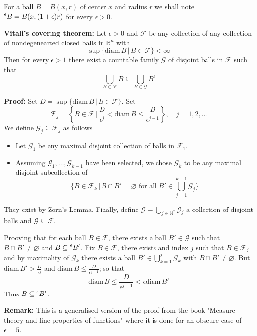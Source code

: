 \documentclass{article}
\begin{document}
For a ball $B=B(x, r)$ of center $x$ and radius $r$ we shall note $\prescript{\epsilon}{}B
=B(x, (1+\epsilon)r)$ for every $\epsilon>0$.

\vspace{1ex}
\textbf{Vitali's covering theorem:}
Let $\epsilon > 0$ and $\mathcal{F}$ be any collection of any collection of
nondegenearted closed balls in $\mathbb{R}^n$ with
\[ \sup\{\text{diam}\,B\,|\, B\in\mathcal{F}\}<\infty \]
Then for every $\epsilon>1$ there exist a countable family $\mathcal{G}$ of
disjoint balls in $\mathcal{F}$ such that
\[\bigcup_{B\in\mathcal{F}}B\subseteq\bigcup_{B\in\mathcal{G}}B^\epsilon\]

\vspace{1ex}
\textbf{Proof:}
Set $D=\sup\{\text{diam}\,B\,|\,B\in \mathcal{F}\}$. Set
\[\mathcal{F}_j=\left\{B\in\mathcal{F}\,|\,\frac{D}{\epsilon^j}<\text{diam}\,B\leq\frac{D}{\epsilon^{j-1}}\right\},\quad j=1,2,\ldots\]
We define $\mathcal{G}_j\subseteq\mathcal{F}_j$ as follows
\begin{itemize}
    \item Let $\mathcal{G}_1$ be any maximal disjoint collection of balls in
        $\mathcal{F}_1$.

    \item Assuming $\mathcal{G}_1,\ldots,\mathcal{G}_{k-1}$ have been selected,
        we chose $\mathcal{G}_k$ to be any maximal disjoint subcollection of
        \[ \{B\in\mathcal{F}_k\,|\,B\cap B'=\varnothing\text{ for all }B'\in\bigcup_{j=1}^{k-1}\mathcal{G}_j\}\]
\end{itemize}
They exist by Zorn's Lemma. Finally, define $\mathcal{G}=\bigcup_{j\in\mathbb{N}^*}\mathcal{G}_j$
a collection of disjoint balls and $\mathcal{G}\subseteq\mathcal{F}$.

\vspace{1ex}
Prooving that for each ball $B\in\mathcal{F}$, there exists a ball $B'\in\mathcal{G}$
such that $B\cap B'\neq\varnothing$ and $B\subseteq\prescript{\epsilon}{}B'$. Fix
$B\in\mathcal{F}$, there exists and index $j$ such that $B\in\mathcal{F}_j$ and
by maximality of $\mathcal{G}_k$ there exists a ball $B'\in\bigcup_{k=1}^j
\mathcal{G}_k$ with $B\cap B'\neq\varnothing$. But $\text{diam}\,B'>\frac{D}{\epsilon^j}$
and $\text{diam}\,B\leq\frac{D}{\epsilon^{j-1}}$; so that
\[ \text{diam}\,B\leq \frac{D}{\epsilon^{j-1}} < \epsilon\text{diam}\,B'\]
Thus $B\subseteq\prescript{\epsilon}{}B'$.

\vspace{1ex}
\textbf{Remark:} This is a generalised version of the proof from the book
"Measure theory and fine properties of functions" where it is done for an
obscure case of $\epsilon=5$.
\end{document}
